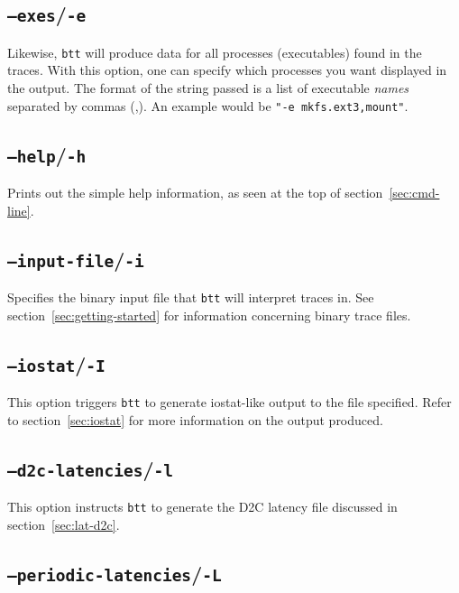 \documentclass{article}
\begin{document}
\subsection{\label{sec:o-e}\texttt{--exes}/\texttt{-e}}

  Likewise, \texttt{btt} will produce data for all processes (executables)
  found in the traces. With this option, one can specify which processes
  you want displayed in the output. The format of the string passed is
  a list of executable \emph{names} separated by commas (,). An example
  would be \texttt{"-e mkfs.ext3,mount"}.

\subsection{\label{sec:o-h}\texttt{--help}/\texttt{-h}}

  Prints out the simple help information, as seen at the top of
  section~\ref{sec:cmd-line}.

\subsection{\label{sec:o-i}\texttt{--input-file}/\texttt{-i}}

  Specifies the binary input file that \texttt{btt} will interpret traces
  in. See section~\ref{sec:getting-started} for information concerning
  binary trace files.

\subsection{\label{sec:o-I}\texttt{--iostat}/\texttt{-I}}

  This option triggers \texttt{btt} to generate iostat-like output to the
  file specified. Refer to section~\ref{sec:iostat} for more information
  on the output produced.

\subsection{\label{sec:o-l}\texttt{--d2c-latencies}/\texttt{-l}}

  This option instructs \texttt{btt} to generate the D2C latency file
  discussed in section~\ref{sec:lat-d2c}.

\subsection{\label{sec:o-L}\texttt{--periodic-latencies}/\texttt{-L}}
\end{document}
